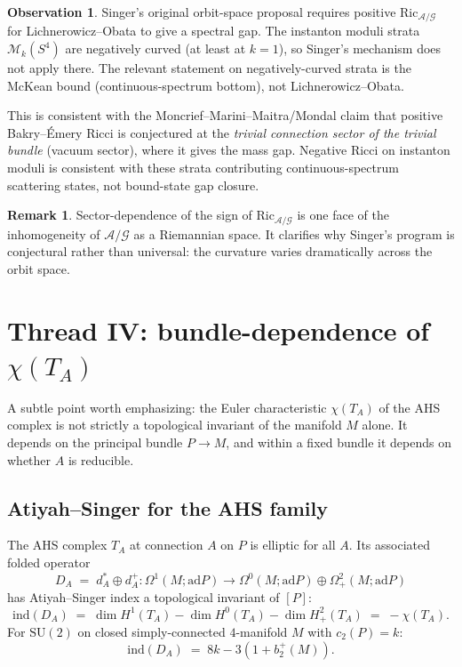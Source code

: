 \documentclass[11pt,letterpaper]{article}
\theoremstyle{definition}
\newtheorem{remark}[theorem]{Remark}
\newtheorem{observation}[theorem]{Observation}
\newcommand{\cA}{\mathcal{A}}
\newcommand{\cG}{\mathcal{G}}
\newcommand{\cM}{\mathcal{M}}
\newcommand{\ad}{\mathrm{ad}}
\newcommand{\Ric}{\mathrm{Ric}}
\begin{document}
\begin{observation}\label{obs:sign-of-Ric}
Singer's original orbit-space proposal \cite{Singer1981} requires positive $\Ric_{\cA/\cG}$ for Lichnerowicz--Obata to give a spectral gap. The instanton moduli strata $\cM_k(S^4)$ are negatively curved (at least at $k=1$), so Singer's mechanism does not apply there. The relevant statement on negatively-curved strata is the McKean bound (continuous-spectrum bottom), not Lichnerowicz--Obata.

This is consistent with the Moncrief--Marini--Maitra/Mondal claim that positive Bakry--\'Emery Ricci is conjectured at the \emph{trivial connection sector of the trivial bundle} (vacuum sector), where it gives the mass gap. Negative Ricci on instanton moduli is consistent with these strata contributing continuous-spectrum scattering states, not bound-state gap closure.
\end{observation}

\begin{remark}
Sector-dependence of the sign of $\Ric_{\cA/\cG}$ is one face of the inhomogeneity of $\cA/\cG$ as a Riemannian space. It clarifies why Singer's program is conjectural rather than universal: the curvature varies dramatically across the orbit space.
\end{remark}

\section{Thread IV: bundle-dependence of $\chi(T_A)$}\label{sec:bundle-dep}

A subtle point worth emphasizing: the Euler characteristic $\chi(T_A)$ of the AHS complex is not strictly a topological invariant of the manifold $M$ alone. It depends on the principal bundle $P\to M$, and within a fixed bundle it depends on whether $A$ is reducible.

\subsection{Atiyah--Singer for the AHS family}

The AHS complex $T_A$ at connection $A$ on $P$ is elliptic for all $A$. Its associated folded operator
\[
D_A \;=\; d_A^* \oplus d_A^+ : \Omega^1(M;\ad P) \to \Omega^0(M;\ad P) \oplus \Omega^2_+(M;\ad P)
\]
has Atiyah--Singer index a topological invariant of $[P]$:
\begin{equation}\label{eq:AS-AHS}
\mathrm{ind}(D_A) \;=\; \dim H^1(T_A) - \dim H^0(T_A) - \dim H^2_+(T_A) \;=\; -\chi(T_A).
\end{equation}
For $\mathrm{SU}(2)$ on closed simply-connected $4$-manifold $M$ with $c_2(P) = k$:
\begin{equation}\label{eq:AHS-index-formula}
\mathrm{ind}(D_A) \;=\; 8k - 3(1+b_2^+(M)).
\end{equation}
\end{document}
